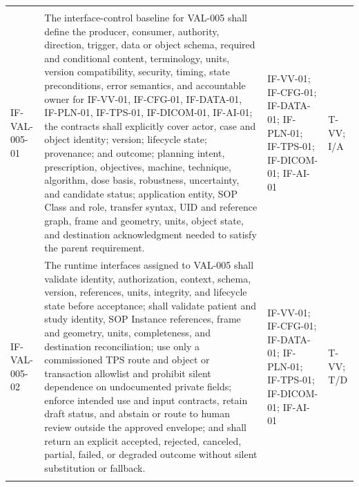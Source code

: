 \documentclass[11pt,letterpaper]{article}
\begin{document}
\begin{scriptsize}
\begin{longtable}{@{}L{0.14\textwidth}L{0.49\textwidth}L{0.19\textwidth}L{0.10\textwidth}@{}}
\addlinespace[2pt]
 \\
\addlinespace[2pt]
\mbox{IF-VAL-005-01} & The interface-control baseline for VAL-005 shall define the producer, consumer, authority, direction, trigger, data or object schema, required and conditional content, terminology, units, version compatibility, security, timing, state preconditions, error semantics, and accountable owner for IF-VV-01, IF-CFG-01, IF-DATA-01, IF-PLN-01, IF-TPS-01, IF-DICOM-01, IF-AI-01; the contracts shall explicitly cover actor, case and object identity; version; lifecycle state; provenance; and outcome; planning intent, prescription, objectives, machine, technique, algorithm, dose basis, robustness, uncertainty, and candidate status; application entity, SOP Class and role, transfer syntax, UID and reference graph, frame and geometry, units, object state, and destination acknowledgment needed to satisfy the parent requirement. & IF-VV-01; IF-CFG-01; IF-DATA-01; IF-PLN-01; IF-TPS-01; IF-DICOM-01; IF-AI-01 & T-VV; I\slash\allowbreak{}A \\
\addlinespace[2pt]
\mbox{IF-VAL-005-02} & The runtime interfaces assigned to VAL-005 shall validate identity, authorization, context, schema, version, references, units, integrity, and lifecycle state before acceptance; shall validate patient and study identity, SOP Instance references, frame and geometry, units, completeness, and destination reconciliation; use only a commissioned TPS route and object or transaction allowlist and prohibit silent dependence on undocumented private fields; enforce intended use and input contracts, retain draft status, and abstain or route to human review outside the approved envelope; and shall return an explicit accepted, rejected, canceled, partial, failed, or degraded outcome without silent substitution or fallback. & IF-VV-01; IF-CFG-01; IF-DATA-01; IF-PLN-01; IF-TPS-01; IF-DICOM-01; IF-AI-01 & T-VV; T\slash\allowbreak{}D \\
\addlinespace[2pt]

\end{longtable}
\end{scriptsize}
\end{document}
